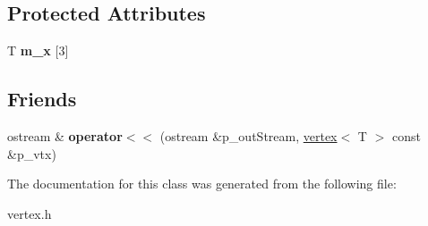\subsection*{Protected Attributes}
\begin{DoxyCompactItemize}
\item 
\hypertarget{classpolygons_1_1vertex_afa8a8def08c6d6894e21a945845b165e}{T {\bfseries m\-\_\-x} \mbox{[}3\mbox{]}}\label{classpolygons_1_1vertex_afa8a8def08c6d6894e21a945845b165e}

\end{DoxyCompactItemize}
\subsection*{Friends}
\begin{DoxyCompactItemize}
\item 
\hypertarget{classpolygons_1_1vertex_af4bb2e5e1c59f13862d734823e541911}{ostream \& {\bfseries operator$<$$<$} (ostream \&p\-\_\-out\-Stream, \hyperlink{classpolygons_1_1vertex}{vertex}$<$ T $>$ const \&p\-\_\-vtx)}\label{classpolygons_1_1vertex_af4bb2e5e1c59f13862d734823e541911}

\end{DoxyCompactItemize}


The documentation for this class was generated from the following file\-:\begin{DoxyCompactItemize}
\item 
vertex.\-h\end{DoxyCompactItemize}
